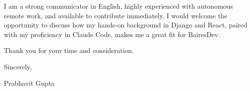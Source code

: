 \documentclass[11pt,a4paper]{article}
\begin{document}
\vspace{3mm}

\noindent I am a strong communicator in English, highly experienced with autonomous remote work, and available to contribute immediately. I would welcome the opportunity to discuss how my hands-on background in Django and React, paired with my proficiency in Claude Code, makes me a great fit for BairesDev.

\vspace{3mm}

\noindent Thank you for your time and consideration.

\vspace{5mm}

\noindent Sincerely,

\vspace{3mm}

\noindent Prabhavit Gupta
\end{document}
